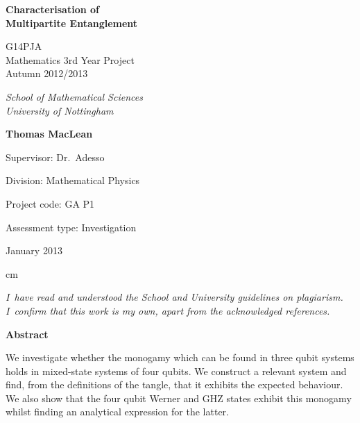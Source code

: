 \documentclass[12pt,a4paper]{article}
\numberwithin{equation}{section}
\begin{document}
\vglue 1cm




\begin{center}
{\Huge
\bf
Characterisation of
\\
\vspace{5mm}
Multipartite Entanglement}

\vskip 1cm

{\Large
G14PJA
\\
Mathematics 3rd Year Project
\\
Autumn
2012/2013}
\\

\vskip 5mm

{\large
\it
School of Mathematical Sciences
\\
University of Nottingham
}

\vskip 15mm

{\Large
\bf
Thomas MacLean}

\vskip 5mm

{\large
Supervisor: Dr.~Adesso}

{\large
Division: Mathematical Physics}

{\large
Project code: GA P1}

{\large
Assessment type: Investigation}



\vskip 5mm

{\large
January 2013}

\end{center}

 cm

\noindent
{\it I~have read and understood the School and University guidelines
on plagiarism. I~confirm that this work is my own, apart from the
acknowledged references.}






\newpage

\vglue 1cm

\begin{center}
{\bf Abstract}
\end{center}

\vskip 1cm

\begin{center}
\begin{minipage}[c]{5in}
We investigate whether the monogamy which can be found in three qubit systems holds in mixed-state systems of four qubits. We construct a relevant system and find, from the definitions of the tangle, that it exhibits the expected behaviour. We also show that the four qubit Werner and GHZ states exhibit this monogamy whilst finding an analytical expression for the latter.
\end{minipage}
\end{center}
\end{document}
